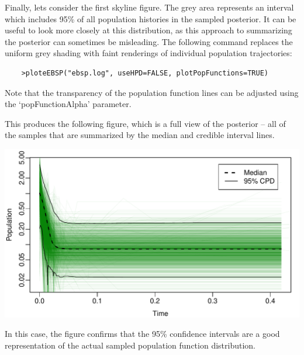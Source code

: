 \documentclass[a4paper,11pt]{article}
\begin{document}
Finally, lets consider the first skyline figure. The grey area represents an
interval which includes 95\% of all population histories in the sampled
posterior.  It can be useful to look more closely at this distribution, as this
approach to summarizing the posterior can sometimes be misleading.  The
following command replaces the uniform grey shading with faint renderings of
individual population trajectories:

\begin{verbatim}
    >ploteEBSP("ebsp.log", useHPD=FALSE, plotPopFunctions=TRUE)
\end{verbatim}

Note that the transparency of the population function lines can be adjusted
using the `popFunctionAlpha' parameter. 

This produces the following figure, which is a full view of the posterior --
all of the samples that are summarized by the median and credible interval
lines.

\includegraphics[width=\textwidth]{figures/mystery3.pdf}

In this case, the figure confirms that the 95\% confidence intervals are a good
representation of the actual sampled population function distribution.



\end{document}
